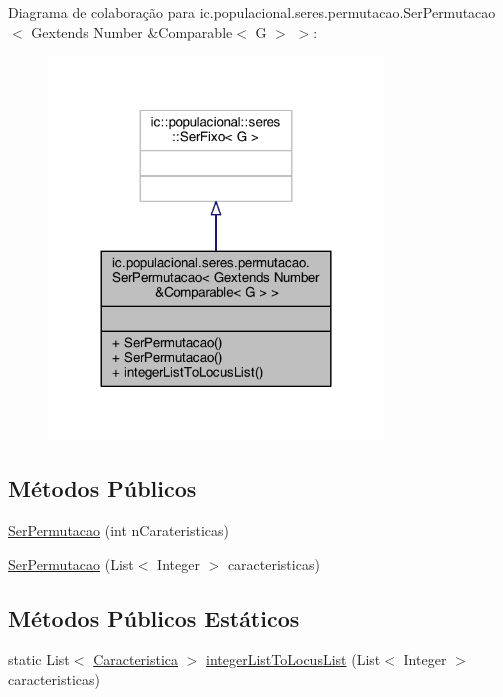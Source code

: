 Diagrama de colaboração para ic.\-populacional.\-seres.\-permutacao.\-Ser\-Permutacao$<$ Gextends Number \&Comparable$<$ G $>$ $>$\-:
\nopagebreak
\begin{figure}[H]
\begin{center}
\leavevmode
\includegraphics[width=252pt]{classic_1_1populacional_1_1seres_1_1permutacao_1_1_ser_permutacao_3_01_gextends_01_number_01_6_c8e2ca791b5af35347261f4c8efd20f20}
\end{center}
\end{figure}
\subsection*{Métodos Públicos}
\begin{DoxyCompactItemize}
\item 
\hyperlink{classic_1_1populacional_1_1seres_1_1permutacao_1_1_ser_permutacao_3_01_gextends_01_number_01_6_comparable_3_01_g_01_4_01_4_ac94d2ffcede2b38d31e34c6aa6dafb54}{Ser\-Permutacao} (int n\-Carateristicas)
\item 
\hyperlink{classic_1_1populacional_1_1seres_1_1permutacao_1_1_ser_permutacao_3_01_gextends_01_number_01_6_comparable_3_01_g_01_4_01_4_ac5b8c08f765d09a834eda03970eceb60}{Ser\-Permutacao} (List$<$ Integer $>$ caracteristicas)
\end{DoxyCompactItemize}
\subsection*{Métodos Públicos Estáticos}
\begin{DoxyCompactItemize}
\item 
static List$<$ \hyperlink{interfaceic_1_1populacional_1_1_caracteristica}{Caracteristica} $>$ \hyperlink{classic_1_1populacional_1_1seres_1_1permutacao_1_1_ser_permutacao_3_01_gextends_01_number_01_6_comparable_3_01_g_01_4_01_4_acfe8a3c36e5abe8c208157bc964b91e9}{integer\-List\-To\-Locus\-List} (List$<$ Integer $>$ caracteristicas)
\end{DoxyCompactItemize}


